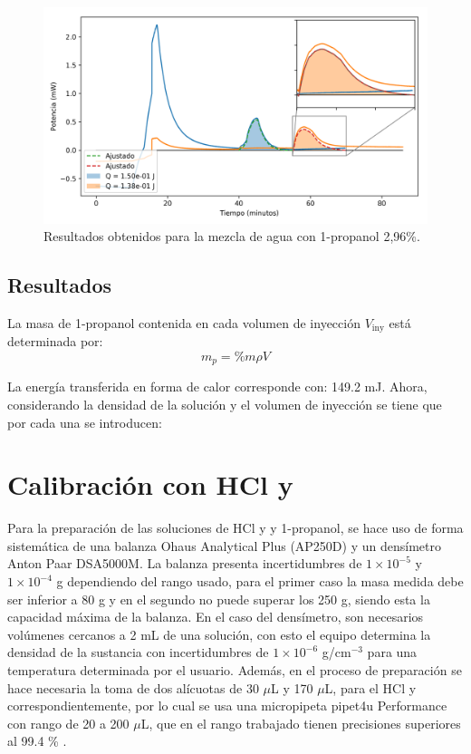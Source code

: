 	\begin{figure}[h]
		\centering
		\includegraphics[width=\linewidth]{../Data/ChemicalCalibrations/singlePropanol}
		\caption{Resultados obtenidos para la mezcla de agua con 1-propanol 2,96\%.}
		\label{fig: singleInjection}
	\end{figure}
	
	\subsection{Resultados}
	La masa de 1-propanol contenida en cada volumen de inyecci\'on $V_\text{iny}$ est\'a determinada por:
	\begin{equation}
	m_p = \%m\rho V
	\end{equation}
	
	La energ\'ia transferida en forma de calor corresponde con: 149.2 mJ. Ahora, considerando la densidad de la soluci\'on y el volumen de inyecci\'on se tiene que por cada una se introducen:

\section{Calibraci\'on con HCl y }\label{sec: soluciones}
	Para la preparaci\'on de las soluciones de HCl y  y 1-propanol, se hace uso de forma sistem\'atica de una balanza Ohaus Analytical Plus (AP250D) y un dens\'imetro Anton Paar DSA5000M. La balanza presenta incertidumbres de $1\times10^{-5}$ y $1\times10^{-4}$ g dependiendo del rango usado, para el primer caso la masa medida debe ser inferior a 80 g y en el segundo no puede superar los 250 g, siendo esta la capacidad máxima de la balanza. En el caso del densímetro, son necesarios volúmenes cercanos a 2 mL de una soluci\'on, con esto el equipo determina la densidad de la sustancia con incertidumbres de $1\times10^{-6}$ g/cm$^{-3}$ para una temperatura determinada por el usuario. Adem\'as, en el proceso de preparaci\'on se hace necesaria la toma de dos al\'icuotas de 30 $\mu$L y 170 $\mu$L, para el HCl y  correspondientemente, por lo cual se usa una micropipeta pipet4u Performance con rango de 20 a 200 $\mu$L, que en el rango trabajado tienen precisiones superiores al 99.4 \% \cite{pipet4u}.
	

